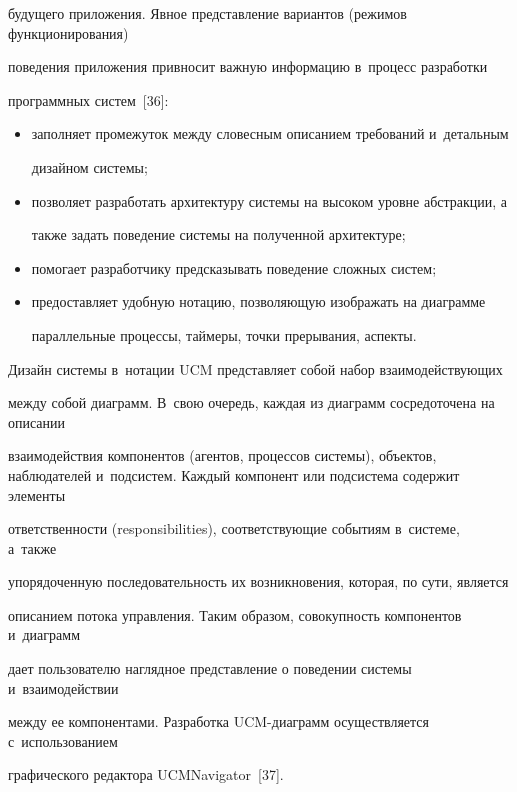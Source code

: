 будущего приложения. Явное представление вариантов (режимов функционирования)


поведения приложения привносит важную информацию в~процесс разработки


программных систем~[36]:


   \begin{itemize}


\item заполняет промежуток между словесным описанием требований и~детальным


дизайном системы;


\item позволяет разработать архитектуру системы на высоком уровне абстракции, а


также задать поведение системы на полученной архитектуре;


\item помогает разработчику предсказывать поведение сложных систем;


\item предоставляет удобную нотацию, позволяющую изображать на диаграмме


параллельные процессы, таймеры, точки прерывания, аспекты.


\end{itemize}





   Дизайн системы в~нотации UCM представляет собой набор взаимодей\-ст\-ву\-ющих


между собой диаграмм. В~свою очередь, каждая из диаграмм сосредоточена на описании


взаимодействия компонентов (агентов, процессов системы), объектов, наблюдателей и~подсистем. Каждый компонент или подсистема содержит элементы


ответственности (responsibilities), соответствующие событиям в~системе, а~также


упорядоченную последовательность их возникновения, которая, по сути, является


описанием потока управления. Таким образом, совокупность компонентов и~диаграмм


дает пользователю наглядное представление о поведении системы и~взаимодействии


между ее компонентами. Разработка UCM-диаграмм осуществляется с~использованием


графического редактора UCMNavigator~[37].





